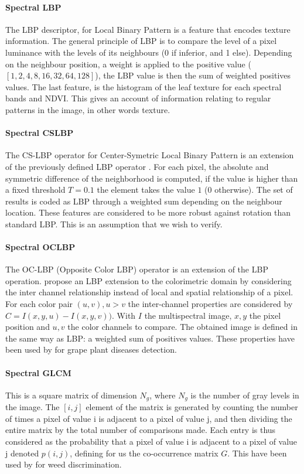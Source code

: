 \documentclass[../thesis.tex]{subfiles}
\begin{document}
    \paragraph{Spectral LBP} The LBP descriptor, for Local Binary Pattern is a feature that encodes texture information. The general principle of LBP is to compare the level of a pixel luminance with the levels of its neighbours (0 if inferior, and 1 else). Depending on the neighbour position, a weight is applied to the positive value ($[1,2,4,8,16,32,64,128]$), the LBP value is then the sum of weighted positives values. The last feature, is the histogram of the leaf texture for each spectral bands and NDVI. This gives an account of information relating to regular patterns in the image, in other words texture.
    
    \paragraph{Spectral CSLBP} The CS-LBP operator for Center-Symetric Local Binary Pattern is an extension of the previously defined LBP operator \cite{Banerji2003Chapter1L}. For each pixel, the absolute and symmetric difference of the neighborhood is computed, if the value is higher than a fixed threshold $T=0.1$ the element takes the value $1$ ($0$ otherwise). The set of results is coded as LBP through a weighted sum depending on the neighbour location. These features are considered to be more robust against rotation than standard LBP. This is an assumption that we wish to verify.
    
    \paragraph{Spectral OCLBP} The OC-LBP (Opposite Color LBP) operator is an extension of the LBP operation. \cite{Banerji2003Chapter1L} propose an LBP extension to the colorimetric domain by considering the inter channel relationship instead of local and spatial relationship of a pixel. For each color pair $(u,v), u>v$ the inter-channel properties are considered by $C=I(x,y,u) - I(x,y,v))$. With $I$ the multispectral image, $x,y$ the pixel position and $u,v$ the color channels to compare. The obtained image is defined in the same way as LBP: a weighted sum of positives values. These properties have been used by \cite{7566749} for grape plant diseases detection.%
    
    \paragraph{Spectral GLCM} This is a square matrix of dimension $N_g$, where $N_g$ is the number of gray levels in the image. The $[i,j]$ element of the matrix is generated by counting the number of times a pixel of value i is adjacent to a pixel of value j, and then dividing the entire matrix by the total number of comparisons made. Each entry is thus considered as the probability that a pixel of value i is adjacent to a pixel of value j denoted $p(i,j)$, defining for us the co-occurrence matrix $G$. This have been used by \cite{bakhshipour2017weed} for weed discrimination.
    
\end{document}
